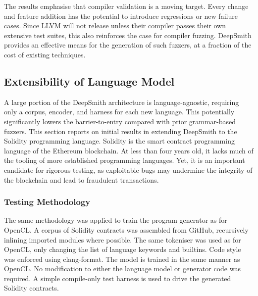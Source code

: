 \begin{table}
  \centering %
  
  \caption[Number of DeepSmith programs which trigger errors]{%
    The number of DeepSmith programs which trigger distinct Clang front-end assertions, and the number of programs which trigger unreachables.%
  }
  \label{tab:clang-crash-rate}
\end{table}

The results emphasise that compiler validation is a moving target. Every change and feature addition has the potential to introduce regressions or new failure cases. Since LLVM will not release unless their compiler passes their own extensive test suites, this also reinforces the case for compiler fuzzing. DeepSmith provides an effective means for the generation of such fuzzers, at a fraction of the cost of existing techniques.


\subsection{Extensibility of Language Model}
\label{subsec:deepsmith-solidity-extensibility}



A large portion of the DeepSmith architecture is language-agnostic, requiring only a corpus, encoder, and harness for each new language. This potentially significantly lowers the barrier-to-entry compared with prior grammar-based fuzzers. This section reports on initial results in extending DeepSmith to the Solidity programming language. Solidity is the smart contract programming language of the Ethereum blockchain. At less than four years old, it lacks much of the tooling of more established programming languages. Yet, it is an important candidate for rigorous testing, as exploitable bugs may undermine the integrity of the blockchain and lead to fraudulent transactions.


\subsubsection{Testing Methodology}

The same methodology was applied to train the program generator as for OpenCL. A corpus of Solidity contracts was assembled from GitHub, recursively inlining imported modules where possible. The same tokeniser was used as for OpenCL, only changing the list of language keywords and builtins. Code style was enforced using clang-format. The model is trained in the same manner as OpenCL. No modification to either the language model or generator code was required. A simple compile-only test harness is used to drive the generated Solidity contracts.


